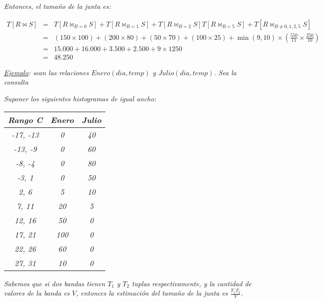 \documentclass[a4paper, twoside]{article}
\newcommand{\codedir}{../resources/code} %
\begin{document}
\emph{Entonces, el tamaño de la junta es:}

\begin{eqnarray*}
	T \left[ R \bowtie S \right] & = & T \left[ R \bowtie_{B=0} S \right] + T \left[ R \bowtie_{B=1} S \right] + T \left[ R \bowtie_{B=2} S \right] T \left[ R \bowtie_{B=5} S \right] + T \left[ R \bowtie_{B\neq0,1,2,5} S \right]\\
	 & = & \left( 150 \times 100 \right) + \left( 200 \times 80 \right) + \left( 50 \times 70 \right) + \left( 100 \times 25 \right) + \min(9,10) \times \left( \frac{550}{11} \times \frac{250}{10} \right)\\
	 & = & 15.000+16.000+3.500+2.500+9 \times 1250\\
	 & = & 48.250
\end{eqnarray*}

\emph{\uline{Ejemplo}}\emph{: sean las relaciones $Enero(dia,temp)$ y $Julio(dia,temp)$. Sea la consulta}



\emph{Suponer los siguientes histogramas de igual ancho:}

\begin{center}
	\begin{tabular}{|c|c|c|}
		\hline 
		\emph{Rango C\textdegree{}} & \emph{Enero} & \emph{Julio}\\
		\hline 
		\hline 
		\emph{-17, -13} & \emph{0} & \emph{40}\\
		\hline 
		\emph{-13, -9} & \emph{0} & \emph{60}\\
		\hline 
		\emph{-8, -4} & \emph{0} & \emph{80}\\
		\hline 
		\emph{-3, 1} & \emph{0} & \emph{50}\\
		\hline 
		\emph{2, 6} & \emph{5} & \emph{10}\\
		\hline 
		\emph{7, 11} & \emph{20} & \emph{5}\\
		\hline 
		\emph{12, 16} & \emph{50} & \emph{0}\\
		\hline 
		\emph{17, 21} & \emph{100} & \emph{0}\\
		\hline 
		\emph{22, 26} & \emph{60} & \emph{0}\\
		\hline 
		\emph{27, 31} & \emph{10} & \emph{0}\\
		\hline 
	\end{tabular}
\end{center}

\emph{Sabemos que si dos bandas tienen $T_{1}$ y $T_{2}$ tuplas respectivamente, y la cantidad de valores de la banda es $V$, entonces la estimación del tamaño de la junta es $\frac{T_{1}T_{2}}{V}$.}
\end{document}

